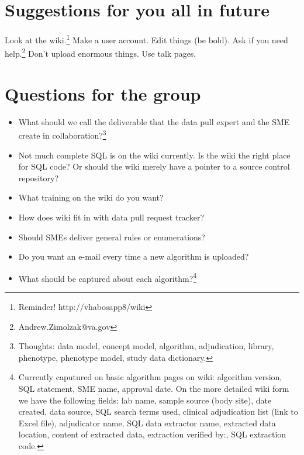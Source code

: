 \documentclass{tufte-handout}
\begin{document}
\section{Suggestions for you all in future}

Look at the wiki.\footnote{Reminder! http://vhabosapp8/wiki} Make a
user account. Edit things (be bold). Ask if you need
help.\footnote{Andrew.Zimolzak@va.gov} Don't upload enormous things.
Use talk pages.

\section{Questions for the group}

\begin{itemize}

\item What should we call the deliverable that the data pull expert
  and the SME create in collaboration?\footnote{Thoughts: data
    model, concept model, algorithm, adjudication, library, phenotype,
    phenotype model, study data dictionary.}

\item Not much complete SQL is on the wiki currently. Is the wiki the
  right place for SQL code? Or should the wiki merely have a pointer
  to a source control repository?

\item What training on the wiki do you want?

\item How does wiki fit in with data pull request tracker?

\item Should SMEs deliver general rules or enumerations?

\item Do you want an e-mail every time a new algorithm is uploaded?

\item What should be captured about each algorithm?\footnote{Currently
  caputured on basic algorithm pages on wiki: algorithm version, SQL
  statement, SME name, approval date. On the more detailed wiki form
  we have the following fields: lab name, sample source (body site),
  date created, data source, SQL search terms used, clinical
  adjudication list (link to Excel file), adjudicator name, SQL data
  extractor name, extracted data location, content of extracted data,
  extraction verified by:, SQL extraction code.}

\end{itemize}
\end{document}
